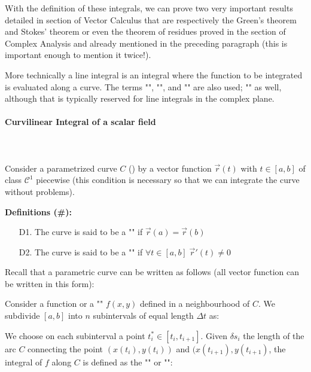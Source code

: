 	With the definition of these integrals, we can prove two very important results detailed in section of Vector Calculus that are respectively the Green's theorem and Stokes' theorem or even the theorem of residues proved in the section of Complex Analysis and already mentioned in the preceding paragraph (this is important enough to mention it twice!).
	
	More technically a line integral is an integral where the function to be integrated is evaluated along a curve. The terms "", "", and "" are also used; "" as well, although that is typically reserved for line integrals in the complex plane.
	
	\paragraph{Curvilinear Integral of a scalar field}\mbox{}\\\\
	Consider a parametrized curve $C$ () by a vector function $\vec{r}(t)$ with $t \in [a,b]$ of class $\mathcal{C}^1$ piecewise (this condition is necessary so that we can integrate the curve without problems).
	
	\textbf{Definitions (\#\mydef):}
	 \begin{enumerate}
	 	\item[D1.] The curve is said to be a "" if $\vec{r}(a)=\vec{r}(b)$
	 	
	 	\item[D2.] The curve is said to be a "" if $\forall t \in [a,b]\; \vec{r}'(t)\neq 0$
	 \end{enumerate}
	 Recall that a parametric curve can be written as follows (all vector function can be written in this form):
	 
	Consider a function or a "" $f(x,y)$ defined in a neighbourhood of $C$. We subdivide $[a,b]$ into $n$ subintervals of equal length $\Delta t$ as:
	
	We choose on each subinterval a point $t_i^*\in [t_i,t_{i+1}]$. Given $\delta s_i$ the length of the arc $C$ connecting the point $(x(t_i),y(t_i))$ and $(x(t_{i+1}),y(t_{i+1})$, the integral of $f$ along $C$ is defined as the "" or "":
	
